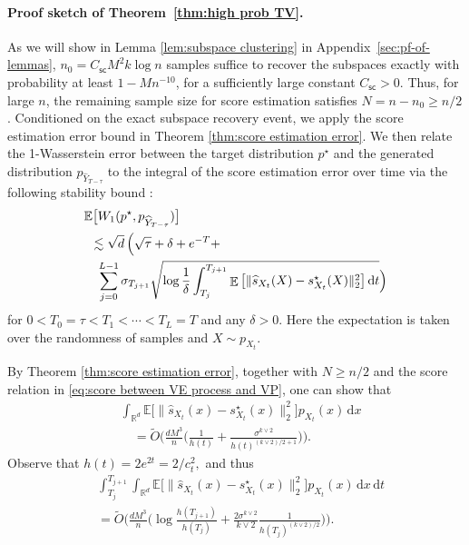 \documentclass{article}
\newcommand{\bE}{\mathbb{E}}
\newcommand{\diff}{\,\mathrm{d}}
\newcommand{\wt}{\widetilde}
\theoremstyle{plain}
\theoremstyle{remark}
\begin{document}
\paragraph{Proof sketch of Theorem~\ref{thm:high prob TV}.}
As we will show in Lemma \ref{lem:subspace clustering} in Appendix~\ref{sec:pf-of-lemmas}, $n_0=C_{\mathsf{sc}}M^2k\log n$ samples suffice to recover the subspaces exactly with probability at least $1-Mn^{-10}$, for a sufficiently large constant $C_{\mathsf{sc}}>0$. Thus, for large $n$, the remaining sample size for score estimation satisfies $N=n-n_0 \geq n/2$.
Conditioned on the exact subspace recovery event, we apply the score estimation error bound in Theorem \ref{thm:score estimation error}. We then relate the 1-Wasserstein error between the target distribution $p^\star$ and the generated distribution $p_{\widehat{Y}_{T-\tau}}$ 
to the integral of the score estimation error over time via the following stability bound \citep{oko2023diffusionmodelsminimaxoptimal,azangulov2025convergencediffusionmodelsmanifold,tang24a}:
\begin{align}
    & \mathbb{E}\big[W_1(p^\star,p_{\widehat{Y}_{T-\tau}})\big] \notag\\
    & \,\,\,\lesssim \sqrt{d} \, \Big( \sqrt{\tau} + \delta + e^{-T}+  \notag\\ 
    & \quad \sum_{j=0}^{L-1} \sigma_{T_{j+1}} \sqrt{\log \frac1\delta \int_{T_j}^{T_{j+1}} \mathop{\bE}\big[ \| \widehat{s}_{X_t}(X)-s_{X_t}^\star(X)\|_2^2\big] \diff t}\Big) \label{eq:W1_convergence_rate} 
\end{align}
for $0<T_0=\tau < T_1< \cdots <T_L = T$ and any $\delta>0$. Here the expectation is taken over the randomness of samples and $X \sim p_{X_t}$.

By Theorem \ref{thm:score estimation error}, together with $N\geq n/2$ and the score relation in \eqref{eq:score between VE process and VP}, one can show that
\begin{align*}
    & \int_{\mathbb{R}^d}\mathbb{E}\big[ \| \widehat{s}_{X_t}(x)-s^\star_{X_t}(x)\|_2^2\big] p_{X_t}(x) \diff x \\
    &\quad =\wt O\bigg( \frac{dM^3}{n} \Big( \frac{1}{h(t)}+\frac{\sigma^{k\vee2}}{h(t)^{{(k\vee2)}/2+1}}\Big)\bigg).
\end{align*}
Observe that 
$
    h(t) = 2e^{2t} = 2/c_t^2,
$
and thus 
\begin{align*}
    & \int_{T_j}^{T_{j+1}} \int_{\mathbb{R}^d}\mathbb{E}\big[ \| \widehat{s}_{X_t}(x)-s^\star_{X_t}(x)\|_2^2\big] p_{X_t}(x) \diff x \diff t \\
    & = \wt O\bigg( \frac{dM^3}{n} \Big( \log \frac{h(T_{j+1})}{h(T_j)} + \frac{2\sigma^{k\vee2}}{k\vee2}\frac{1}{h(T_j)^{(k\vee2)/2}} \Big)\bigg). 
\end{align*}
\end{document}

